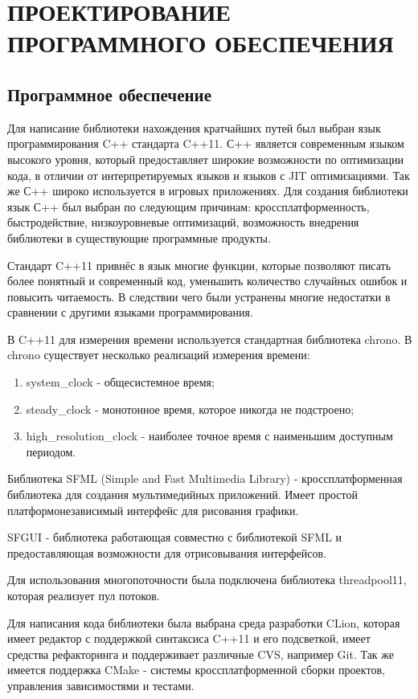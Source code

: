 \section{\MakeTextUppercase{ПРОЕКТИРОВАНИЕ ПРОГРАММНОГО ОБЕСПЕЧЕНИЯ}}
\subsection{Программное обеспечение}

Для написание библиотеки нахождения кратчайших путей был выбран язык программирования C++ стандарта C++11. С++ является современным языком высокого уровня, который предоставляет широкие возможности по оптимизации кода, в отличии от интерпретируемых языков и языков с JIT оптимизациями. Так же С++ широко используется в игровых приложениях. Для создания библиотеки язык С++ был выбран по следующим причинам: кроссплатформенность, быстродействие, низкоуровневые оптимизаций, возможность внедрения библиотеки в существующие программные продукты. 

Стандарт C++11 привнёс в язык многие функции, которые позволяют писать более понятный и современный код, уменьшить количество случайных ошибок и повысить читаемость. В следствии чего были устранены многие недостатки в сравнении с другими языками программирования.

В C++11 для измерения времени используется стандартная библиотека chrono. В chrono существует несколько реализаций измерения времени:

\begin{enumerate}
    \item system\_clock - общесистемное время;
    \item steady\_clock - монотонное время, которое никогда не подстроено;
    \item high\_resolution\_clock - наиболее точное время с наименьшим доступным периодом.  
\end{enumerate} 

Библиотека SFML (Simple and Fast Multimedia Library) - кроссплатформенная библиотека для создания мультимедийных приложений. Имеет простой платформонезависимый интерфейс для рисования графики.

SFGUI - библиотека работающая совместно с библиотекой SFML и предоставляющая возможности для отрисовывания интерфейсов.

Для использования многопоточности была подключена библиотека threadpool11, которая реализует пул потоков.

Для написания кода библиотеки была выбрана среда разработки CLion, которая имеет редактор с поддержкой синтаксиса C++11 и его подсветкой, имеет средства рефакторинга и поддерживает различные CVS, например Git. Так же имеется поддержка CMake - системы кроссплатформенной сборки проектов, управления зависимостями и тестами.

